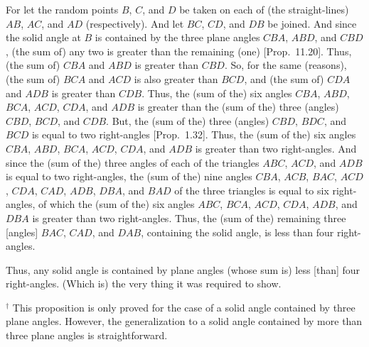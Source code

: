 \begin{Parallel}{}{}
{For let the random points $B$, $C$, and $D$ be taken on each of (the straight-lines)
 $AB$, $AC$, and $AD$ (respectively). And let $BC$, $CD$, and $DB$ be joined.  And since the solid angle at $B$ is contained
by the three plane angles $CBA$, $ABD$, and $CBD$, (the sum of) any two
is greater than the remaining (one) [Prop.~11.20].
Thus, (the sum of) $CBA$ and $ABD$ is greater than $CBD$. So, for
the same (reasons), (the sum of) $BCA$ and $ACD$ is also greater than
$BCD$, and (the sum of) $CDA$ and $ADB$ is greater than $CDB$.
Thus, the (sum of the) six angles $CBA$, $ABD$, $BCA$, $ACD$, $CDA$,
and $ADB$ is greater than the (sum of the) three (angles) $CBD$, $BCD$,
and $CDB$. But, the (sum of the) three (angles) $CBD$, $BDC$, and
$BCD$ is equal to two right-angles [Prop.~1.32].
Thus, the (sum of the) six angles $CBA$, $ABD$, $BCA$, $ACD$, $CDA$,
and $ADB$ is greater than two right-angles.
And since the (sum of the) three angles of each of the triangles
$ABC$, $ACD$, and $ADB$ is equal to two right-angles, the (sum of the)
nine angles $CBA$, $ACB$, $BAC$, $ACD$, $CDA$, $CAD$, $ADB$,
$DBA$, and $BAD$ of the three triangles is equal to six right-angles,
of which the (sum of the) six angles $ABC$, $BCA$, $ACD$, $CDA$,
$ADB$, and $DBA$ is greater than two right-angles. Thus, the (sum of the)
remaining three [angles] $BAC$, $CAD$, and $DAB$, containing the
solid angle, is less than four right-angles.

Thus, any solid angle is contained by plane angles (whose sum is) less [than]
four  right-angles. (Which is) the very thing it was required to show.}
\end{Parallel}
{\footnotesize\noindent$^\dag$ This proposition is only proved for the case of a solid angle contained by three plane angles. However, the generalization to
a solid angle contained by more than three plane angles is straightforward.}

